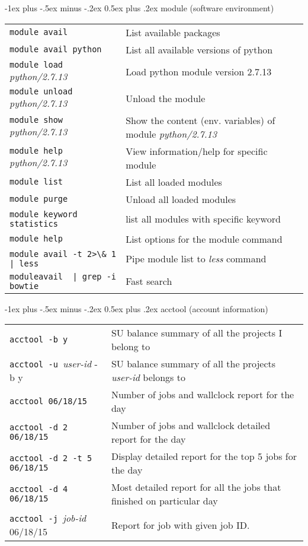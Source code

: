 \documentclass[10pt,landscape]{article}
\makeatletter
\renewcommand{\section}{\@startsection{section}{1}{0mm}%
                                {-1ex plus -.5ex minus -.2ex}%
                                {0.5ex plus .2ex}%
                                {\normalfont\large\bfseries}}
\makeatother
\begin{document}
\begin{multicols*}{2}
\section{module (software environment)}
\begin{tabular}{@{}ll@{}}
\verb!module avail!   & List available packages \\
\verb!module avail python!   & List all available versions of python \\
\verb!module load !\textit{python/2.7.13}    & Load python module version 2.7.13 \\
\verb!module unload !\textit{python/2.7.13}    & Unload the module\\ 
\verb!module show !\textit{python/2.7.13}    & Show the content (env. variables) of module \textit{python/2.7.13} \\
\verb!module help !\textit{python/2.7.13}    & View information/help for specific module\\ 
\verb!module list !    & List all loaded modules\\
\verb!module purge !    & Unload all loaded modules\\
\verb!module keyword statistics  !    & list all modules with specific keyword\\
\verb!module help !    & List options for the module command\\
\verb!module avail -t 2>\& 1 | less!   & Pipe module list to \textit{less} command\\
\verb!moduleavail  | grep -i bowtie!   & Fast search \\
\end{tabular}

\vspace{15pt}

\section{acctool (account information) }
\begin{tabular}{@{}ll@{}}
\verb!acctool -b y!   & SU balance summary of all the projects I belong to \\
\verb!acctool -u !\textit{user-id} -b y   & SU balance summary of all the projects \textit{user-id} belongs to \\
\verb!acctool 06/18/15!   & Number of jobs and wallclock report for the day \\
\verb!acctool -d 2 06/18/15!   & Number of jobs and wallclock detailed report for the day \\
\verb!acctool -d 2 -t 5 06/18/15!   & Display detailed report for the top 5 jobs for the day \\
\verb!acctool -d 4 06/18/15!   & Most detailed report for all the jobs that finished on particular day \\
\verb!acctool -j !\textit{job-id} 06/18/15  & Report for job with given job ID. \\
\end{tabular}


\end{multicols*}
\end{document}
